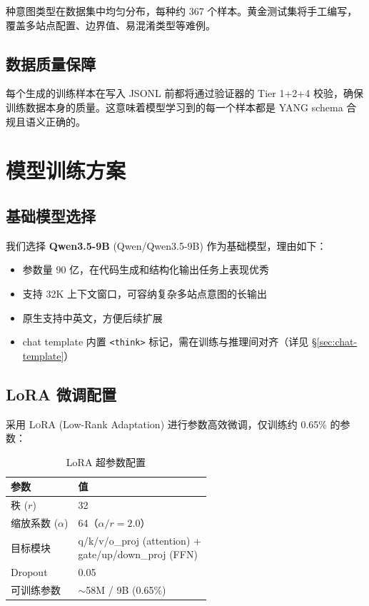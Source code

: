 \documentclass[12pt, a4paper]{article}
\newcommand{\yang}{\textsc{YANG}}
\newcommand{\lora}{\textsc{LoRA}}
\begin{document}
 种意图类型在数据集中均匀分布，每种约 367 个样本。黄金测试集将手工编写，覆盖多站点配置、边界值、易混淆类型等难例。

\subsection{数据质量保障}

每个生成的训练样本在写入 JSONL 前都将通过验证器的 Tier 1+2+4 校验，确保训练数据本身的质量。这意味着模型学习到的每一个样本都是 \yang{} schema 合规且语义正确的。

\section{模型训练方案}
\label{sec:training}

\subsection{基础模型选择}

我们选择 \textbf{Qwen3.5-9B} (Qwen/Qwen3.5-9B) 作为基础模型，理由如下：

\begin{itemize}
  \item 参数量 90 亿，在代码生成和结构化输出任务上表现优秀
  \item 支持 32K 上下文窗口，可容纳复杂多站点意图的长输出
  \item 原生支持中英文，方便后续扩展
  \item chat template 内置 \texttt{<think>} 标记，需在训练与推理间对齐（详见 \S\ref{sec:chat-template}）
\end{itemize}

\subsection{LoRA 微调配置}

采用 \lora{} (Low-Rank Adaptation) 进行参数高效微调，仅训练约 0.65\% 的参数：

\begin{table}[H]
\centering
\caption{LoRA 超参数配置}
\label{tab:lora-config}
\small
\begin{tabular}{ll}
\toprule
\textbf{参数} & \textbf{值} \\
\midrule
秩 ($r$)                & 32 \\
缩放系数 ($\alpha$)     & 64（$\alpha/r = 2.0$）\\
目标模块               & \makecell[l]{q/k/v/o\_proj (attention) +\\gate/up/down\_proj (FFN)} \\
Dropout                & 0.05 \\
可训练参数             & $\sim$58M / 9B (0.65\%) \\
\bottomrule
\end{tabular}
\end{table}
\end{document}

